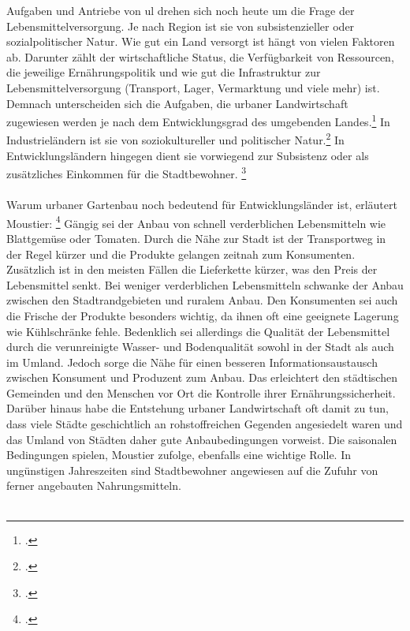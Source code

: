 \documentclass{scrartcl}
\begin{document}
Aufgaben und Antriebe von \acs{ul} drehen sich noch heute um die Frage der Lebensmittelversorgung. Je nach Region ist sie von subsistenzieller oder sozialpolitischer Natur. Wie gut ein Land versorgt ist hängt von vielen Faktoren ab. Darunter zählt der wirtschaftliche Status, die Verfügbarkeit von Ressourcen, die jeweilige Ernährungspolitik und wie gut die Infrastruktur zur Lebensmittelversorgung (Transport, Lager, Vermarktung und viele mehr) ist. Demnach unterscheiden sich die Aufgaben, die urbaner Landwirtschaft zugewiesen werden je nach dem Entwicklungsgrad des umgebenden Landes.\footcite{Smit2001UrbanToday} In Industrieländern ist sie von soziokultureller und politischer Natur.\footcites[][S. 21]{Berges2014UrbaneStadt}[S.26f]{Smit2001UrbanToday} In Entwicklungsländern hingegen dient sie vorwiegend zur Subsistenz oder als zusätzliches Einkommen für die Stadtbewohner. \footcites[Vgl.][S.75]{Nugent2000TheEconomies}[S.26f]{Smit2001UrbanToday}\\
\\
Warum urbaner Gartenbau noch bedeutend für Entwicklungsländer ist, erläutert Moustier: \footcites[Vgl.][S.6ff]{Moustier2007UrbanSupplier} Gängig sei der Anbau von schnell verderblichen Lebensmitteln wie Blattgemüse oder Tomaten. Durch die Nähe zur Stadt ist der Transportweg in der Regel kürzer und die Produkte gelangen zeitnah zum Konsumenten. Zusätzlich ist in den meisten Fällen die Lieferkette kürzer, was den Preis der Lebensmittel senkt. Bei weniger verderblichen Lebensmitteln schwanke der Anbau zwischen den Stadtrandgebieten und ruralem Anbau. Den Konsumenten sei auch die Frische der Produkte besonders wichtig, da ihnen oft eine geeignete Lagerung wie Kühlschränke fehle. Bedenklich sei allerdings die Qualität der Lebensmittel durch die verunreinigte Wasser- und Bodenqualität sowohl in der Stadt als auch im Umland. Jedoch sorge die Nähe für einen besseren Informationsaustausch zwischen Konsument und Produzent zum Anbau. Das erleichtert den städtischen Gemeinden und den Menschen vor Ort die Kontrolle ihrer Ernährungssicherheit. Darüber hinaus habe die Entstehung urbaner Landwirtschaft oft damit zu tun, dass viele Städte geschichtlich an rohstoffreichen Gegenden angesiedelt waren und das Umland von Städten daher gute Anbaubedingungen vorweist. Die saisonalen Bedingungen spielen, Moustier zufolge, ebenfalls eine wichtige Rolle. In ungünstigen Jahreszeiten sind Stadtbewohner angewiesen auf die Zufuhr von ferner angebauten Nahrungsmitteln. \\
\\
\end{document}
